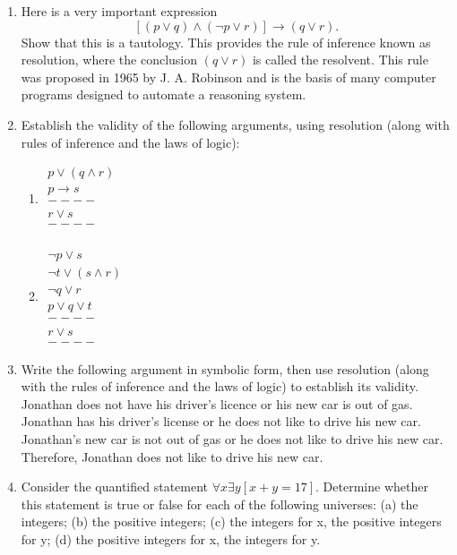 \documentclass[a4paper]{article}
\begin{document}
\begin{enumerate}
\item Here is a very important expression $$[(p\lor q)\land(\neg p\lor r)]\rightarrow(q\lor r).$$ Show that this is a tautology. This provides the rule of inference known as resolution, where the conclusion $(q\lor r )$ is called the resolvent. This rule was proposed in 1965 by J. A. Robinson and is the basis of many computer programs designed to automate a reasoning system. 

\item Establish the validity of the following arguments, using resolution (along with rules of inference and the laws of logic):
	\begin{enumerate}
		\item 
		$\begin{array}{l}
			p\lor(q\land r)\\
			p\rightarrow s\\
			----\\
			r\lor s\\
			----\\
		\end{array}$\\

	\item $\begin{array}{l}
			\neg p \lor s\\
			\neg t \lor (s \land r )\\
			\neg q \lor r\\
			p\lor q \lor t\\
			----\\
			r\lor s\\
			----
		\end{array}$
	\end{enumerate}

\item Write the following argument in symbolic form, then use resolution (along with the rules of inference and the laws of logic) to establish its validity.\\
	Jonathan does not have his driver's licence or his new car is out of gas. Jonathan has his driver's license or he does not like to drive his new car. Jonathan's new car is not out of gas or he does not like to drive his new car. Therefore, Jonathan does not like to drive his new car.

\item Consider the quantified statement $\forall x \exists y [x+y=17]$. Determine whether this statement is true or false for each of the following universes: (a) the integers; (b) the positive integers; (c) the integers for x, the positive integers for y; (d) the positive integers for x, the integers for y.

\end{enumerate}
\end{document}
